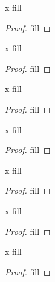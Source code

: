 \begin{exercise}{x}
fill
\end{exercise}
\begin{proof}
fill
\end{proof} 

\begin{exercise}{x}
fill
\end{exercise}
\begin{proof}
fill
\end{proof} 

\begin{exercise}{x}
fill
\end{exercise}
\begin{proof}
fill
\end{proof} 

\begin{exercise}{x}
fill
\end{exercise}
\begin{proof}
fill
\end{proof} 

\begin{exercise}{x}
fill
\end{exercise}
\begin{proof}
fill
\end{proof} 

\begin{exercise}{x}
fill
\end{exercise}
\begin{proof}
fill
\end{proof} 

\begin{exercise}{x}
fill
\end{exercise}
\begin{proof}
fill
\end{proof} 